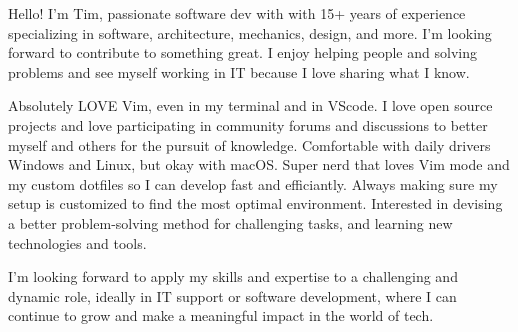 

\begin{cvparagraph}

Hello! I'm Tim, passionate software dev with with 15+ years of experience specializing in software, architecture, mechanics, design, and more. I'm looking forward to contribute to something great. I enjoy helping people and solving problems and see myself working in IT because I love sharing what I know.

Absolutely LOVE Vim, even in my terminal and in VScode. I love open source projects and love participating in community forums and discussions to better myself and others for the pursuit of knowledge. Comfortable with daily drivers Windows and Linux, but okay with macOS. Super nerd that loves Vim mode and my custom dotfiles so I  can develop fast and efficiantly. Always making sure my setup is customized  to find the most optimal environment. Interested in devising a better problem-solving method for challenging tasks, and learning new technologies and tools.

I'm looking forward to apply my skills and expertise to a challenging and dynamic role, ideally in IT support or software development, where I can continue to grow and make a meaningful impact in the world of tech.
\end{cvparagraph}
